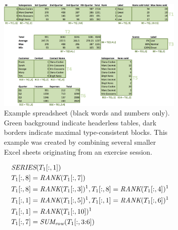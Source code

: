 \documentclass{IEEEtran}
\newcommand{\range}[3]{\ensuremath{#1[#2,#3]}}
\newcommand{\rangeto}[2]{#1{:}#2}
\newcommand{\rangeall}{:}
\newcommand{\eccalc}[2]{\ensuremath{#1 = #2}}
\newcommand{\ecrank}[2]{\eccalc{#1}{\textit{RANK}(#2)}}
\newcommand{\ecperm}[1]{\ensuremath{\textit{PERMUTATION}(#1)}}
\newcommand{\ecseries}[1]{\ensuremath{\textit{SERIES}(#1)}}
\newcommand{\ecsumr}[2]{\eccalc{#1}{\textit{SUM\textsubscript{row}}(#2)}}
\theoremstyle{definition}
\begin{document}
\begin{figure}[thb]

  \begin{subfigure}{.65\textwidth}
  \begin{center}
    \includegraphics[width=1\textwidth]{figures/Demo2.png}
  \end{center}
  \vspace{-10pt}
  \caption{
    Example spreadsheet (black words and numbers only).
    Green background indicate headerless tables, dark borders indicate maximal type-consistent blocks.
    This example was created by combining several smaller Excel sheets originating from an exercise session.
  }
  \label{fig:main_example}
\end{subfigure}
\hfill
\begin{subfigure}{.35\textwidth}
  {\footnotesize
    \begin{align*}
      &~\ecseries{\range{T_{1}}{\rangeall}{1}} \\
%
%
      &~\ecrank{\range{T_{1}}{\rangeall}{8}}{\range{T_{1}}{\rangeall}{7}}\\
      &~\ecrank{\range{T_{1}}{\rangeall}{8}}{\range{T_{1}}{\rangeall}{3}}^1, \ecrank{\range{T_{1}}{\rangeall}{8}}{\range{T_{1}}{\rangeall}{4}}^1 \\
      &~\ecrank{\range{T_{1}}{\rangeall}{1}}{\range{T_{1}}{\rangeall}{5}}^1 , \ecrank{\range{T_{1}}{\rangeall}{1}}{\range{T_{1}}{\rangeall}{6}}^1 \\
      &~\ecrank{\range{T_{1}}{\rangeall}{1}}{\range{T_{1}}{\rangeall}{10}}^1 \\
%
      &~\ecsumr{\range{T_{1}}{\rangeall}{7}}{\range{T_{1}}{\rangeall}{\rangeto{3}{6}}} \\

\end{align*}}
\end{subfigure}
\end{figure}
\end{document}
